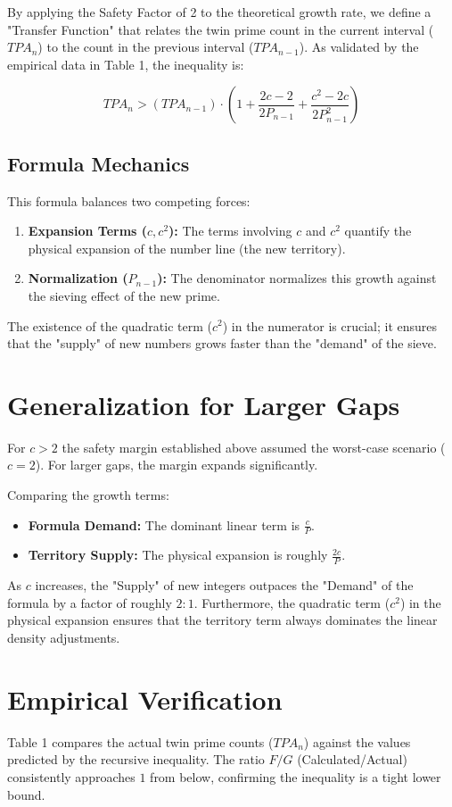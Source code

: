 \documentclass[sn-mathphys-num, pdflatex]{sn-jnl}
\begin{document}
By applying the Safety Factor of 2 to the theoretical growth rate, we define a "Transfer Function" that relates the twin prime count in the current interval ($TPA_n$) to the count in the previous interval ($TPA_{n-1}$). As validated by the empirical data in Table 1, the inequality is:

\begin{equation}
    TPA_n > (TPA_{n-1}) \cdot \left(1 + \frac{2c - 2}{2P_{n-1}} + \frac{c^2 - 2c}{2P_{n-1}^2}\right) \label{eq:growth}
\end{equation}

\subsection{Formula Mechanics}
This formula balances two competing forces:
\begin{enumerate}
    \item \textbf{Expansion Terms ($c, c^2$):} The terms involving $c$ and $c^2$ quantify the physical expansion of the number line (the new territory).
    \item \textbf{Normalization ($P_{n-1}$):} The denominator normalizes this growth against the sieving effect of the new prime.
\end{enumerate}
The existence of the quadratic term ($c^2$) in the numerator is crucial; it ensures that the "supply" of new numbers grows faster than the "demand" of the sieve.


\section{Generalization for Larger Gaps} 
For $c>2$ the safety margin established above assumed the worst-case scenario ($c=2$). For larger gaps, the margin expands significantly.

Comparing the growth terms:
\begin{itemize}
    \item \textbf{Formula Demand:} The dominant linear term is $\frac{c}{P}$.
    \item \textbf{Territory Supply:} The physical expansion is roughly $\frac{2c}{P}$.
\end{itemize}
As $c$ increases, the "Supply" of new integers outpaces the "Demand" of the formula by a factor of roughly $2:1$. Furthermore, the quadratic term ($c^2$) in the physical expansion ensures that the territory term always dominates the linear density adjustments.

\section{Empirical Verification}
Table 1 compares the actual twin prime counts ($TPA_n$) against the values predicted by the recursive inequality. The ratio $F/G$ (Calculated/Actual) consistently approaches $1$ from below, confirming the inequality is a tight lower bound.
\end{document}
